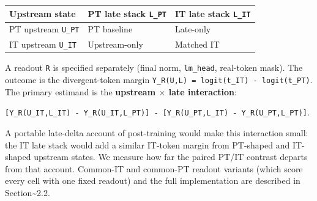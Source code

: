 \documentclass[11pt]{article}
\begin{document}
\begin{table}[t]
\centering
\small
\setlength{\tabcolsep}{3pt}
\begin{tabularx}{\linewidth}{@{}>{\raggedright\arraybackslash}X >{\raggedright\arraybackslash}X >{\raggedright\arraybackslash}X@{}}
\toprule
Upstream state & PT late stack \texttt{L\_PT} & IT late stack \texttt{L\_IT} \\
\midrule
PT upstream \texttt{U\_PT} & PT baseline & Late-only \\
IT upstream \texttt{U\_IT} & Upstream-only & Matched IT \\
\bottomrule
\end{tabularx}
\end{table}

A readout \texttt{R} is specified separately (final norm, \texttt{lm\_head}, real-token mask). The outcome is the divergent-token margin \texttt{Y\_R(U,L) = logit(t\_IT) - logit(t\_PT)}. The primary estimand is the \textbf{upstream \ensuremath{\times} late interaction}:

\texttt{[Y\_R(U\_IT,L\_IT) - Y\_R(U\_IT,L\_PT)] - [Y\_R(U\_PT,L\_IT) - Y\_R(U\_PT,L\_PT)]}.

A portable late-delta account of post-training would make this interaction small: the IT late stack would add a similar IT-token margin from PT-shaped and IT-shaped upstream states. We measure how far the paired PT/IT contrast departs from that account. Common-IT and common-PT readout variants (which score every cell with one fixed readout) and the full implementation are described in Section\textasciitilde{}2.2.
\end{document}
